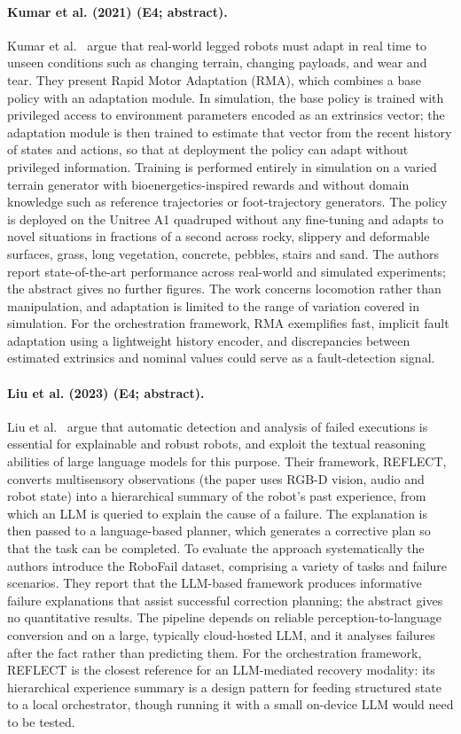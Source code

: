 \documentclass[10pt,a4paper]{article}
\begin{document}
\paragraph{Kumar et al. (2021) (E4; abstract).} Kumar et al.~\cite{Kumar2021} argue that real-world legged robots must adapt in real time to unseen conditions such as changing terrain, changing payloads, and wear and tear. They present Rapid Motor Adaptation (RMA), which combines a base policy with an adaptation module. In simulation, the base policy is trained with privileged access to environment parameters encoded as an extrinsics vector; the adaptation module is then trained to estimate that vector from the recent history of states and actions, so that at deployment the policy can adapt without privileged information. Training is performed entirely in simulation on a varied terrain generator with bioenergetics-inspired rewards and without domain knowledge such as reference trajectories or foot-trajectory generators. The policy is deployed on the Unitree A1 quadruped without any fine-tuning and adapts to novel situations in fractions of a second across rocky, slippery and deformable surfaces, grass, long vegetation, concrete, pebbles, stairs and sand. The authors report state-of-the-art performance across real-world and simulated experiments; the abstract gives no further figures. The work concerns locomotion rather than manipulation, and adaptation is limited to the range of variation covered in simulation. For the orchestration framework, RMA exemplifies fast, implicit fault adaptation using a lightweight history encoder, and discrepancies between estimated extrinsics and nominal values could serve as a fault-detection signal.

\paragraph{Liu et al. (2023) (E4; abstract).} Liu et al.~\cite{Liu2023c} argue that automatic detection and analysis of failed executions is essential for explainable and robust robots, and exploit the textual reasoning abilities of large language models for this purpose. Their framework, REFLECT, converts multisensory observations (the paper uses RGB-D vision, audio and robot state) into a hierarchical summary of the robot's past experience, from which an LLM is queried to explain the cause of a failure. The explanation is then passed to a language-based planner, which generates a corrective plan so that the task can be completed. To evaluate the approach systematically the authors introduce the RoboFail dataset, comprising a variety of tasks and failure scenarios. They report that the LLM-based framework produces informative failure explanations that assist successful correction planning; the abstract gives no quantitative results. The pipeline depends on reliable perception-to-language conversion and on a large, typically cloud-hosted LLM, and it analyses failures after the fact rather than predicting them. For the orchestration framework, REFLECT is the closest reference for an LLM-mediated recovery modality: its hierarchical experience summary is a design pattern for feeding structured state to a local orchestrator, though running it with a small on-device LLM would need to be tested.
\end{document}
